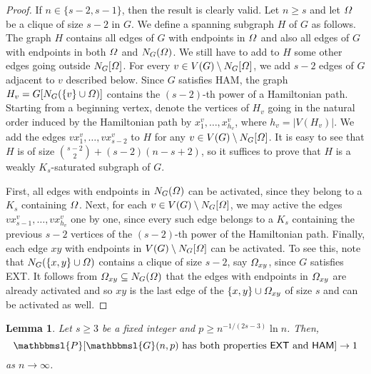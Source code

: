 \documentclass[hidelinks, 11pt]{article}
\theoremstyle{plain}
\newtheorem{lemma}[theorem]{Lemma}
\theoremstyle{definition}
\begin{document}
\begin{proof}
If $n\in\{s-2, s-1\}$, then the  result is clearly valid.    Let $n\geq s$ and let $\mathnormal{\Omega}$ be a clique of size $s-2$  in $G$. We define a  spanning   subgraph $H$ of $G$ as follows.  The  graph  $H$ contains all edges of $G$ with endpoints in $\mathnormal{\Omega}$  and  also   all edges of $G$ with endpoints in both  $\mathnormal{\Omega}$ and $N_G(\mathnormal{\Omega})$. We still have to add to $H$  some other edges going outside $N_G[\mathnormal{\Omega}]$. For every $v\in V(G)\setminus N_G[\mathnormal{\Omega}]$, we add    $s-2$ edges of $G$ adjacent to $v$ described below.  Since $G$   satisfies    {\sf HAM},  the graph $H_v=G[N_G(\{v\}\cup\mathnormal{\Omega})]$ contains  the  $(s-2)$-th power of a Hamiltonian path. Starting from  a beginning vertex, denote the vertices of $H_v$ going in the natural order induced by the Hamiltonian path  by $x^v_1, \ldots, x^v_{h_v}$, where $h_v=|V(H_v)|$. We add the  edges $vx^v_1,  \ldots,  vx^v_{s-2}$ to $H$ for any $v\in V(G)\setminus N_G[\mathnormal{\Omega}]$. It is easy to see that $H$ is of size ${s-2 \choose 2}+(s-2)(n-s+2)$, so it suffices to prove that $H$ is a weakly $K_s$-saturated subgraph of  $G$.


First, all edges with endpoints in  $N_G(\mathnormal{\Omega})$ can be activated,  since they  belong to a  $K_s$ containing  $\mathnormal{\Omega}$. Next, for each $v \in V(G)\setminus N_G[\mathnormal{\Omega}]$, we may active  the edges $vx^v_{s-1},  \ldots, vx^v_{h_v}$ one by one,  since every such edge belongs to a $K_s$  containing the previous $s-2$ vertices of the $(s-2)$-th power of the Hamiltonian path. Finally, each edge $xy$ with endpoints in $V(G)\setminus N_G[\mathnormal{\Omega}]$ can be activated. To see this, note that    $N_G(\{x, y\}\cup\mathnormal{\Omega})$ contains a clique of size $s-2$,  say $\mathnormal{\Omega}_{xy}$, since  $G$   satisfies  {\sf EXT}.  It follows from   $\mathnormal{\Omega}_{xy}\subseteq N_G(\mathnormal{\Omega})$ that the edges  with endpoints in  $\mathnormal{\Omega}_{xy}$ are already activated   and  so $xy$ is the last edge of the  $\{x,y\}\cup\mathnormal{\Omega}_{xy}$ of size $s$ and   can be activated  as well.
\end{proof}




\begin{lemma}\label{12}
Let  $s\geq 3$ be  a fixed  integer and $p\geq n^{-1/(2s-3)}\ln n$. Then,  $$\mathbbmsl{P}[\text{$\mathbbmsl{G}(n, p)$  has both properties $\mathsf{EXT}$ and $\mathsf{HAM}$}]\to1$$ as $n\to\infty$.
\end{lemma}
\end{document}
